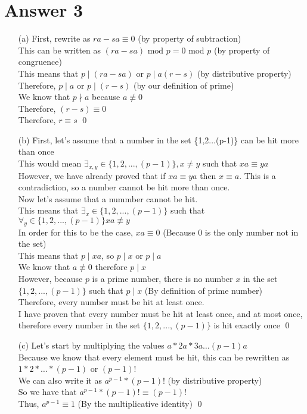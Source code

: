 \documentclass[11pt]{article}
\theoremstyle{definition}
\begin{document}
\section*{Answer 3}
\begin{enumerate}
	\item[(a)]
	First, rewrite as $ra - sa \equiv 0$ (by property of subtraction)\\
	This can be written as $(ra - sa) \text{ mod } p = 0 \text{ mod } p$ (by property of congruence)\\
	This means that $p \mid (ra - sa)$ or $p \mid a(r - s)$ (by distributive property)\\
	Therefore, $p \mid a$ or $p \mid (r - s)$ (by our definition of prime)\\
	We know that $p \nmid a$ because $a \not \equiv 0$\\
	Therefore, $(r - s) \equiv 0$\\
	Therefore, $r \equiv s$ \qed

	\item[(b)]
	First, let's assume that a number in the set \{1,2...(p-1)\} can be hit more than once\\
	This would mean $\exists_{x,y} \in \{1,2,...,(p-1)\}, x \neq y $ such that $xa \equiv ya$ \\
	However, we have already proved that if $xa \equiv ya$ then $x \equiv a$.
	This is a contradiction, so a number cannot be hit more than once.\\
	Now let's assume that a nummber cannot be hit.\\
	This means that $\exists_x \in \{1,2,...,(p-1)\}$ such that $\forall_y \in \{1,2,...,(p-1)\} xa \not \equiv y$\\
	In order for this to be the case, $xa \equiv 0$ (Because 0 is the only number not in the set)\\
	This means that $p \mid xa$, so $p \mid x$ or $p \mid a$\\
	We know that $a \not \equiv 0$ therefore $p \mid x$\\
	However, because $p$ is a prime number, there is no number $x$ in the set $\{1,2,...,(p-1)\}$ such that $p \mid x$ (By definition of prime number)\\
	Therefore, every number must be hit at least once.\\
	I have proven that every number must be hit at least once, and at most once, therefore every number in the set $\{1,2,...,(p-1)\}$ is hit exactly once \qed

	\item[(c)] 
	Let's start by multiplying the values $a*2a*3a\dots (p-1)a$\\
	Because we know that every element must be hit, this can be rewritten as $1*2*\dots*(p-1)$ or $(p-1)!$\\
	We can also write it as $a^{p-1} * (p-1)!$ (by distributive property)\\
	So we have that $a^{p-1} * (p-1)! \equiv (p-1)!$\\
	Thus, $a^{p-1} \equiv 1$ (By the multiplicative identity) \qed


\end{enumerate}
\end{document}
